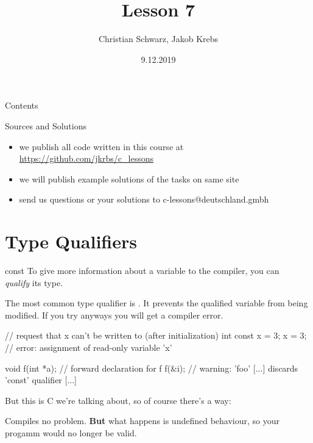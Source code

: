 \documentclass[10pt,graphics,aspectratio=169,table]{beamer}
\title{Lesson 7}
\author{Christian Schwarz, Jakob Krebs}
\date{9.12.2019}
\begin{document}
\maketitle

\begin{frame}{Contents}
    \tableofcontents
\end{frame}

\begin{frame}{Sources and Solutions}
    \begin{itemize}
        \item we publish all code written in this course at \url{https://github.com/jkrbs/c_lessons}
        \item we will publish example solutions of the tasks on same site
        \item send us questions or your solutions to c-lessons@deutschland.gmbh
    \end{itemize}
\end{frame}


\section{Type Qualifiers}
\begin{frame}[fragile]{const}
    To give more information about a variable to the compiler, you can\\
    \textit{qualify} its type. 
    
    The most common type qualifier is .
    It prevents the qualified variable from being modified.
    If you try anyways you will get a compiler error.

    \begin{codeblock}
// request that x can't be written to (after initialization)
int const x = 3; 
x = 3; // error: assignment of read-only variable 'x'

void f(int *a); // forward declaration for f
f(&i); // warning: 'foo' [...] discards 'const' qualifier [...]
    \end{codeblock}

    But this is C we're talking about, so of course there's a way: 

    Compiles no problem. \textbf{But} what happens is undefined behaviour,
    so your progamm would no longer be valid.

\end{frame}
\end{document}
